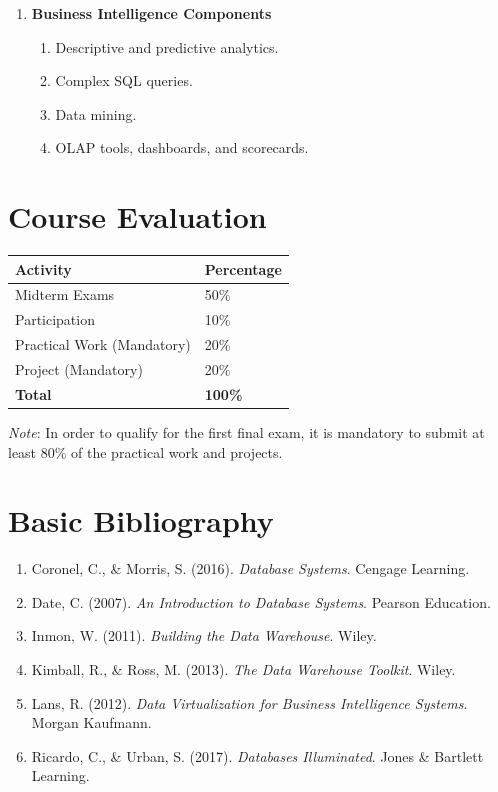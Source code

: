 \documentclass[12pt,a4paper]{article}
\begin{document}
\begin{enumerate}
\begin{enumerate}[label*=\arabic*.]
        \item Loading.
        \item ETL tools.
    \end{enumerate}
    \item \textbf{Business Intelligence Components}
    \begin{enumerate}[label*=\arabic*.]
        \item Descriptive and predictive analytics.
        \item Complex SQL queries.
        \item Data mining.
        \item OLAP tools, dashboards, and scorecards.
    \end{enumerate}
\end{enumerate}

\section*{Course Evaluation}
\begin{table}[h!]
\centering
\begin{tabular}{@{}ll@{}}
\toprule
\textbf{Activity} & \textbf{Percentage} \\
\midrule
Midterm Exams & 50\% \\
Participation & 10\% \\
Practical Work (Mandatory) & 20\% \\
Project (Mandatory) & 20\% \\
\midrule
\textbf{Total} & \textbf{100\%} \\
\bottomrule
\end{tabular}
\end{table}

\noindent \textit{Note}: In order to qualify for the first final exam, it is mandatory to submit at least 80\% of the practical work and projects.

\section*{Basic Bibliography}
\begin{enumerate}
    \item Coronel, C., \& Morris, S. (2016). \textit{Database Systems}. Cengage Learning.
    \item Date, C. (2007). \textit{An Introduction to Database Systems}. Pearson Education.
    \item Inmon, W. (2011). \textit{Building the Data Warehouse}. Wiley.
    \item Kimball, R., \& Ross, M. (2013). \textit{The Data Warehouse Toolkit}. Wiley.
    \item Lans, R. (2012). \textit{Data Virtualization for Business Intelligence Systems}. Morgan Kaufmann.
    \item Ricardo, C., \& Urban, S. (2017). \textit{Databases Illuminated}. Jones \& Bartlett Learning.
\end{enumerate}
\end{document}
